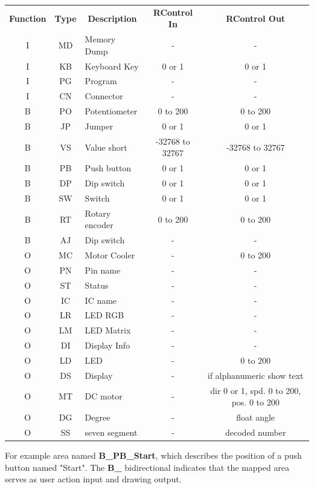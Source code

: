 {%
\newcommand{\mc}[3]{\multicolumn{#1}{#2}{#3}}
\begin{center}
\begin{tabular}{cclcc}
\textbf{Function} & \textbf{Type} & \mc{1}{c}{\textbf{Description}} & \textbf{RControl In} & \textbf{RControl Out}\\
I & MD & Memory Dump & - & -\\
I & KB & Keyboard Key & 0 or 1 & 0 or 1\\
I & PG & Program & - & -\\
I & CN & Connector & - & -\\
B & PO & Potentiometer & 0 to 200 & 0 to 200\\
B & JP & Jumper & 0 or 1 & 0 or 1\\
B & VS & Value short & -32768 to 32767 & -32768 to 32767\\
B & PB & Push button & 0 or 1 & 0 or 1\\
B & DP & Dip switch & 0 or 1 & 0 or 1\\
B & SW & Switch & 0 or 1 & 0 or 1\\
B & RT & Rotary encoder & 0 to 200 & 0 to 200\\
B & AJ & Dip switch & - & -\\
O & MC & Motor Cooler & - & 0 to 200\\
O & PN & Pin name & - & -\\
O & ST & Status & - & -\\
O & IC & IC name & - & -\\
O & LR & LED RGB & - & -\\
O & LM & LED Matrix & - & -\\
O & DI & Display Info & - & -\\
O & LD & LED & - & 0 to 200\\
O & DS & Display & - & if alphanumeric show text\\
O & MT & DC motor & - & dir 0 or 1, spd. 0 to 200, pos. 0 to 200\\
O & DG & Degree & - & float angle\\
O & SS & seven segment & - & decoded number\\
\end{tabular}
\end{center}
}
 

For example area named \textbf{B\_PB\_Start}, which describes the position of a push button named "Start". 
The \textbf{B\_} bidirectional indicates that the mapped area serves as user action input and drawing output.  
 
